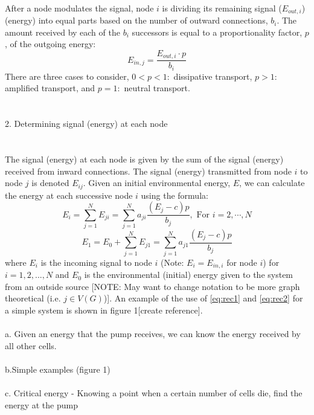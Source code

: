 \documentclass{amsart}
\theoremstyle{plain}
\numberwithin{equation}{section}
\begin{document}
\\
After a node modulates the signal, node $i$ is dividing its remaining signal ($E_{out,i}$)(energy) into equal parts based on the number of outward connections, $b_i$. The amount received by each of the $b_i$ successors is equal to a proportionality factor, $p$, of the outgoing energy: 
\begin{equation}
E_{in,j}=\frac{E_{out,i}\cdot p}{b_i}
\end{equation} There are three cases to consider, $0<p<1: $ dissipative transport, $p > 1: $ amplified transport, and $p=1: $ neutral transport.\\
\\
\\
2. Determining signal (energy) at each node\\
\\
\\
The signal (energy) at each node is given by the sum of the signal (energy) received from inward connections. The signal (energy) transmitted from node $i$ to node $j$ is denoted $E_{ij}$. Given an initial environmental energy, $E$, we can calculate the energy at each successive node $i$ using the formula: 
\begin{equation}\label{eq:rec1}
E_i=\sum_{j=1}^N E_{ji}=\sum_{j=1}^N a_{ji}\frac{(E_j-c)p}{b_j}, \text{ For } i=2,\cdots, N 
\end{equation}
\begin{equation}\label{eq:rec2}
E_1=E_0+\sum_{j=1}^N E_{j1}=\sum_{j=1}^N a_{j1}\frac{(E_j-c)p}{b_j}
\end{equation}
where $E_i$ is the incoming signal to node $i$ (Note: $E_i=E_{in, i}$ for node $i$) for $i=1,2,...,N$ and $E_0$ is the environmental (initial) energy given to the system from an outside source [NOTE: May want to change notation to be more graph theoretical (i.e. $j\in V(G)$)]. An example of the use of \ref{eq:rec1} and \ref{eq:rec2} for a simple system is shown in figure 1[create reference]. 
\\
\\
 a. Given an energy that the pump receives, we can know the energy received by all other cells.\\
\\
 b.Simple examples (figure 1)\\
\\
 c. Critical energy - Knowing a point when a certain number of cells die, find the energy at the pump \\
\\
\end{document}
